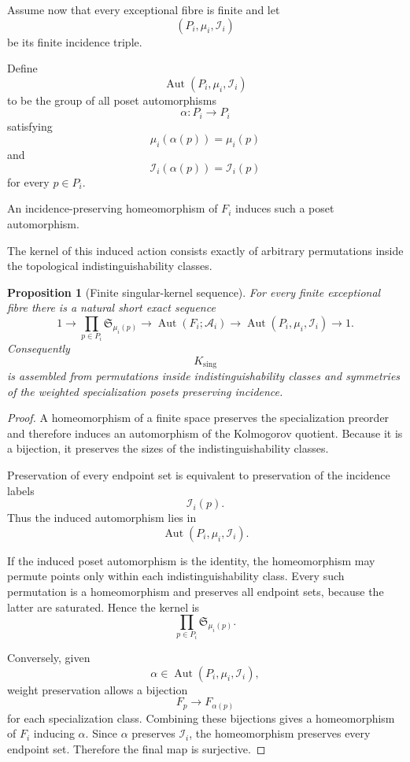 \documentclass[11pt]{article}
\newcommand{\Sym}{\mathfrak{S}}
\theoremstyle{plain}
\newtheorem{proposition}[theorem]{Proposition}
\theoremstyle{definition}
\begin{document}
Assume now that every exceptional fibre is finite and let
\[
(P_i,\mu_i,\mathcal I_i)
\]
be its finite incidence triple.

Define
\[
\operatorname{Aut}(P_i,\mu_i,\mathcal I_i)
\]
to be the group of all poset automorphisms
\[
\alpha:P_i\to P_i
\]
satisfying
\[
\mu_i(\alpha(p))=\mu_i(p)
\]
and
\[
\mathcal I_i(\alpha(p))
=
\mathcal I_i(p)
\]
for every $p\in P_i$.

An incidence-preserving homeomorphism of $F_i$ induces such a poset
automorphism.

The kernel of this induced action consists exactly of arbitrary
permutations inside the topological indistinguishability classes.

\begin{proposition}[Finite singular-kernel sequence]
\label{prop:finite-singular-kernel-sequence}
For every finite exceptional fibre there is a natural short exact
sequence
\[
1
\longrightarrow
\prod_{p\in P_i}
\Sym_{\mu_i(p)}
\longrightarrow
\operatorname{Aut}(F_i;\mathcal A_i)
\longrightarrow
\operatorname{Aut}(P_i,\mu_i,\mathcal I_i)
\longrightarrow
1.
\]
Consequently
\[
K_{\mathrm{sing}}
\]
is assembled from permutations inside indistinguishability classes and
symmetries of the weighted specialization posets preserving incidence.
\end{proposition}

\begin{proof}
A homeomorphism of a finite space preserves the specialization preorder
and therefore induces an automorphism of the Kolmogorov quotient.
Because it is a bijection, it preserves the sizes of the
indistinguishability classes.

Preservation of every endpoint set is equivalent to preservation of the
incidence labels
\[
\mathcal I_i(p).
\]
Thus the induced automorphism lies in
\[
\operatorname{Aut}(P_i,\mu_i,\mathcal I_i).
\]

If the induced poset automorphism is the identity, the homeomorphism may
permute points only within each indistinguishability class.  Every such
permutation is a homeomorphism and preserves all endpoint sets, because
the latter are saturated.  Hence the kernel is
\[
\prod_{p\in P_i}\Sym_{\mu_i(p)}.
\]

Conversely, given
\[
\alpha\in
\operatorname{Aut}(P_i,\mu_i,\mathcal I_i),
\]
weight preservation allows a bijection
\[
F_p\longrightarrow F_{\alpha(p)}
\]
for each specialization class.  Combining these bijections gives a
homeomorphism of $F_i$ inducing $\alpha$.  Since $\alpha$ preserves
$\mathcal I_i$, the homeomorphism preserves every endpoint set.
Therefore the final map is surjective.
\end{proof}
\end{document}
